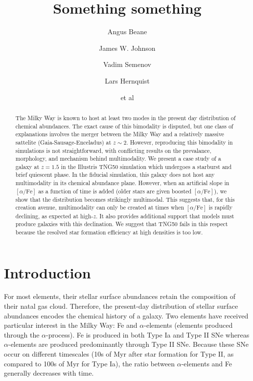 \documentclass[linenumbers, twocolumn]{aastex631}
\newcommand{\alphaFe}{\ensuremath{[\alpha/\textrm{Fe}]}}
\begin{document}
\title{Something something}

\author{Angus Beane}

\author{James W. Johnson}

\author{Vadim Semenov}

\author{Lars Hernquist}

\author{et al}

\begin{abstract}
    The Milky Way is known to host at least two modes in the present day distribution of chemical abundances. The exact cause of this bimodality is disputed, but one class of explanations involves the merger between the Milky Way and a relatively massive sattelite (Gaia-Sausage-Enceladus) at $z\sim2$. However, reproducing this bimodality in simulations is not straightforward, with conflicting results on the prevalance, morphology, and mechanism behind multimodality. We present a case study of a galaxy at $z=1.5$ in the Illustris TNG50 simulation which undergoes a starburst and brief quiescent phase. In the fiducial simulation, this galaxy does not host any multimodality in its chemical abundance plane. However, when an artificial slope in \alphaFe{} as a function of time is added (older stars are given boosted \alphaFe{}), we show that the distribution becomes strikingly multimodal. This suggests that, for this creation avenue, multimodality can only be created at times when \alphaFe{} is rapidly declining, as expected at high-$z$. It also provides additional support that models must produce galaxies with this declination. We suggest that TNG50 fails in this respect because the resolved star formation efficiency at high densities is too low.
  \end{abstract}
    
  

\section{Introduction}\label{sec:intro}
For most elements, their stellar surface abundances retain the composition of their natal gas cloud. Therefore, the present-day distribution of stellar surface abundances encodes the chemical history of a galaxy. Two elements have received particular interest in the Milky Way: Fe and $\alpha$-elements (elements produced through the $\alpha$-process). Fe is produced in both Type Ia and Type II SNe whereas $\alpha$-elements are produced predominantly through Type II SNe. Because these SNe occur on different timescales (10s of Myr after star formation for Type II, as compared to 100s of Myr for Type Ia), the ratio between $\alpha$-elements and Fe generally decreases with time.
\end{document}
